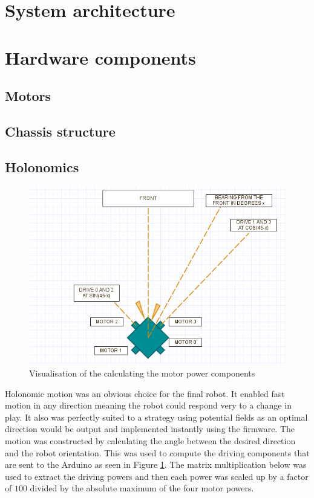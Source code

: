 \documentclass[a4paper,12pt]{article}
\begin{document}
\cleardoublepage
{}
\tableofcontents
\cleardoublepage
{}

\newpage

\section{System architecture}

\section{Hardware components}

\subsection{Motors}

\subsection{Chassis structure}

\subsection{Holonomics}
\begin{figure}
\centering
\includegraphics[scale=.5]{holonomics.png}
\caption{Visualisation of the calculating the motor power components}
\label{fig:components}
\end{figure}

Holonomic motion was an obvious choice for the final robot. It enabled fast motion in any direction meaning the robot could respond very  to a change in play. It also was perfectly suited to a strategy using potential fields as an optimal direction would be output and implemented instantly using the firmware. The motion was constructed by calculating the angle between the desired direction  and the robot orientation. This was used to compute the driving components that are sent to the Arduino as seen in Figure \ref{fig:components}. The matrix multiplication below was used to extract the driving powers and then each power was scaled up by a factor of $100$ divided by the absolute maximum of the four motor powers.
\end{document}

